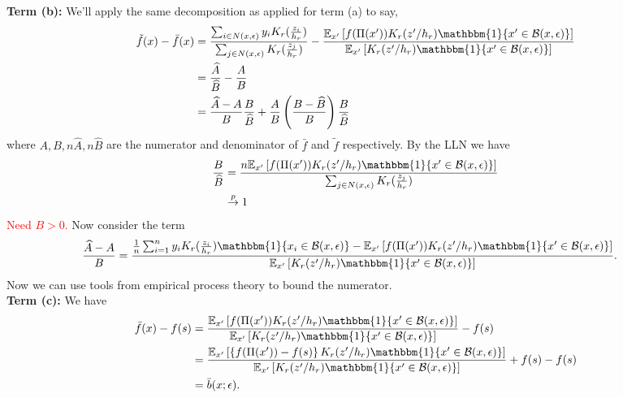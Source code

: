 \documentclass[11pt]{article}
\begin{document}

\noindent\textbf{Term (b):} We'll apply the same decomposition as applied for term (a) to say,
\begin{align*}
    \tilde{f}(x) - \bar{f}(x) &= \frac{\sum_{i \in N(x, \epsilon)}y_iK_r(\frac{z_i}{h_r})}{\sum_{j \in N(x, \epsilon)}K_r(\frac{z_j}{h_r})} - \frac{\mathbb{E}_{x'}\left[f(\Pi(x'))K_r(z'/h_r)\mathbbm{1}\{x'\in \mathcal{B}(x, \epsilon)\}\right]}{\mathbb{E}_{x'}\left[K_r(z'/h_r)\mathbbm{1}\{x'\in \mathcal{B}(x, \epsilon)\}\right]} \\
    &= \frac{\widehat{A}}{\widehat{B}} - \frac{A}{B} \\
    &= \frac{\widehat{A}-A}{B}\frac{B}{\widehat{B}} + \frac{A}{B}\left(\frac{B - \widehat{B}}{B}\right)\frac{B}{\widehat{B}}
\end{align*}
where $A, B, n\widehat{A}, n\widehat{B}$ are the numerator and denominator of $\bar{f}$ and $\tilde{f}$ respectively. By the LLN we have
\begin{align}
    \frac{B}{\widehat{B}} &= \frac{n\mathbb{E}_{x'}\left[f(\Pi(x'))K_r(z'/h_r)\mathbbm{1}\{x'\in \mathcal{B}(x, \epsilon)\}\right]}{\sum_{j \in N(x, \epsilon)}K_r(\frac{z_j}{h_r})}\\
    &\overset{p}\rightarrow 1
\end{align}
\textcolor{red}{Need $B >0 $.} Now consider the term
\begin{align*}
    \frac{\widehat{A} - A}{B} &= \frac{\frac{1}{n}\sum_{i = 1}^n y_iK_r(\frac{z_i}{h_r})\mathbbm{1}\{x_i \in \mathcal{B}(x,\epsilon)\} - \mathbb{E}_{x'}\left[f(\Pi(x'))K_r(z'/h_r)\mathbbm{1}\{x'\in \mathcal{B}(x, \epsilon)\}\right]}{\mathbb{E}_{x'}\left[K_r(z'/h_r)\mathbbm{1}\{x'\in \mathcal{B}(x, \epsilon)\}\right]}.
\end{align*}
Now we can use tools from empirical process theory to bound the numerator. 
\[\]
\noindent\textbf{Term (c):} We have
\begin{align}
    \bar{f}(x) - f(s) &= \frac{\mathbb{E}_{x'}\left[f(\Pi(x'))K_r(z'/h_r)\mathbbm{1}\{x'\in \mathcal{B}(x, \epsilon)\}\right]}{\mathbb{E}_{x'}\left[K_r(z'/h_r)\mathbbm{1}\{x'\in \mathcal{B}(x, \epsilon)\}\right]} - f(s) \\
    &= \frac{\mathbb{E}_{x'}\left[\left\{f(\Pi(x')) - f(s)\right\}K_r(z'/h_r)\mathbbm{1}\{x'\in \mathcal{B}(x, \epsilon)\}\right]}{\mathbb{E}_{x'}\left[K_r(z'/h_r)\mathbbm{1}\{x'\in \mathcal{B}(x, \epsilon)\}\right]} + f(s) - f(s) \\
    &= \bar{b}(x; \epsilon).
\end{align}
\end{document}
